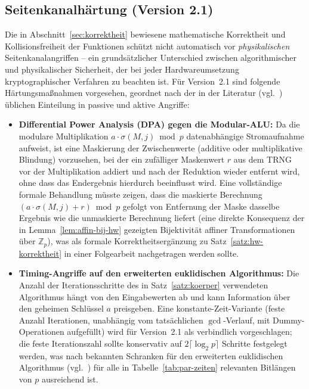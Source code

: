 ﻿\documentclass[a4paper,12pt]{article}
\theoremstyle{definition}
\begin{document}
\subsection{Seitenkanalhärtung (Version 2.1)}

Die in Abschnitt~\ref{sec:korrektheit} bewiesene mathematische Korrektheit und Kollisionsfreiheit der Funktionen schützt nicht automatisch vor \emph{physikalischen} Seitenkanalangriffen -- ein grundsätzlicher Unterschied zwischen algorithmischer und physikalischer Sicherheit, der bei jeder Hardwareumsetzung kryptographischer Verfahren zu beachten ist. Für Version~2.1 sind folgende Härtungsmaßnahmen vorgesehen, geordnet nach der in der Literatur (vgl.\ \cite{KL15}) üblichen Einteilung in passive und aktive Angriffe:

\begin{itemize}
	\item \textbf{Differential Power Analysis (DPA) gegen die Modular-ALU:} Da die modulare Multiplikation $a \cdot \sigma(M,j) \bmod p$ datenabhängige Stromaufnahme aufweist, ist eine Maskierung der Zwischenwerte (additive oder multiplikative Blindung) vorzusehen, bei der ein zufälliger Maskenwert $r$ aus dem TRNG vor der Multiplikation addiert und nach der Reduktion wieder entfernt wird, ohne dass das Endergebnis hierdurch beeinflusst wird. Eine vollständige formale Behandlung müsste zeigen, dass die maskierte Berechnung $(a \cdot \sigma(M,j) + r) \bmod p$ gefolgt von Entfernung der Maske dasselbe Ergebnis wie die unmaskierte Berechnung liefert (eine direkte Konsequenz der in Lemma~\ref{lem:affin-bij-hw} gezeigten Bijektivität affiner Transformationen über $\mathbb{Z}_p$), was als formale Korrektheitsergänzung zu Satz~\ref{satz:hw-korrektheit} in einer Folgearbeit nachgetragen werden sollte.
	\item \textbf{Timing-Angriffe auf den erweiterten euklidischen Algorithmus:} Die Anzahl der Iterationsschritte des in Satz~\ref{satz:koerper} verwendeten Algorithmus hängt von den Eingabewerten ab und kann Information über den geheimen Schlüssel $a$ preisgeben. Eine konstante-Zeit-Variante (feste Anzahl Iterationen, unabhängig vom tatsächlichen $\gcd$-Verlauf, mit Dummy-Operationen aufgefüllt) wird für Version~2.1 als verbindlich vorgeschlagen; die feste Iterationszahl sollte konservativ auf $2\lceil\log_2 p\rceil$ Schritte festgelegt werden, was nach bekannten Schranken für den erweiterten euklidischen Algorithmus (vgl.\ \cite{Buc16}) für alle in Tabelle~\ref{tab:par-zeiten} relevanten Bitlängen von $p$ ausreichend ist.

\end{itemize}
\end{document}
